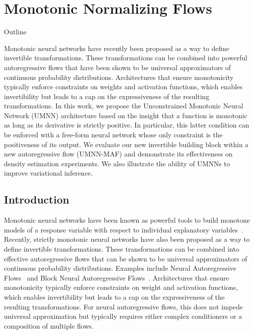 \chapter{Monotonic Normalizing Flows}\label{ch:04}

\begin{remark}{Outline}

Monotonic neural networks have recently been proposed as a way to define invertible transformations.
These transformations can be combined into powerful autoregressive flows that have been shown to be universal approximators of continuous probability distributions.
Architectures that ensure monotonicity typically enforce constraints on weights and activation functions, which enables invertibility but leads to a cap on the expressiveness of the resulting transformations.
In this work, we propose the Unconstrained Monotonic Neural Network (UMNN) architecture based on the insight that a function is monotonic as long as its derivative is strictly positive. In particular, this latter condition can be enforced with a free-form neural network whose only constraint is the positiveness of its output.
We evaluate our new invertible building block within a new autoregressive flow (UMNN-MAF) and demonstrate its effectiveness on density estimation experiments.
We also illustrate the ability of UMNNs to improve variational inference.
\end{remark}


\section{Introduction}

Monotonic neural networks have been known as powerful tools to build monotone models of a response variable with respect to individual explanatory variables~\citep{archer_application_1993, sill_monotonic_1998, daniels2010monotone, gupta_monotonic_2016, you_deep_2017}. Recently, strictly monotonic neural networks have also been proposed as a way to define invertible transformations. These transformations can be combined into effective autoregressive flows that can be shown to be universal approximators of continuous probability distributions. Examples include Neural Autoregressive Flows~\citep[NAF, ][]{huang_neural_2018} and Block Neural Autoregressive Flows~\citep[B-NAF, ][]{de_cao_block_2020}. Architectures that ensure monotonicity typically enforce constraints on weight and activation functions, which enables invertibility but %
leads to a cap on the expressiveness of the resulting transformations.
For neural autoregressive flows, this does not impede universal approximation but typically requires either complex conditioners or a composition of multiple flows.

